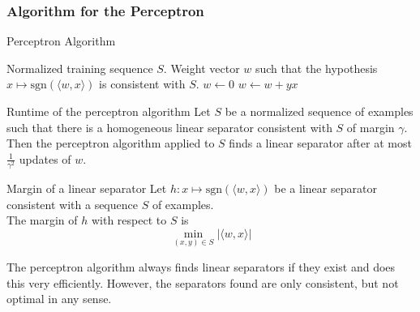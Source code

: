 \documentclass[english]{panikzettel}
\begin{document}
\subsubsection{Algorithm for the Perceptron}
\begin{halfboxl}
\vspace{-\baselineskip}
\begin{algo}{Perceptron Algorithm}
{
\renewcommand{\algorithmicrequire}{\textbf{Input:}}
\renewcommand{\algorithmicensure}{\textbf{Output:}}
  \begin{algorithmic}[1]
  \Require Normalized training sequence $S$.
  \Ensure Weight vector $w$ such that the hypothesis $x\mapsto \text{sgn}(\langle w,x\rangle)$ is consistent with $S$.
  \State $w \leftarrow 0$
  \Repeat
  	\State $w\leftarrow w+yx$
  \EndIf
  \EndFor
  \end{algorithmic}
  }
\end{algo}
\end{halfboxl}
\begin{halfboxr}
\vspace{-\baselineskip}
\begin{theo}{Runtime of the perceptron algorithm}
Let $S$ be a normalized sequence of examples such that there is a homogeneous linear separator consistent with $S$ of margin $\gamma$.\\
Then the perceptron algorithm applied to $S$ finds a linear separator after at most $\frac{1}{\gamma^2}$ updates of $w$.
\end{theo}

\begin{defi}{Margin of a linear separator}
Let $h:x\mapsto \text{sgn}(\langle w,x\rangle)$ be a linear separator consistent with a sequence $S$ of examples.\\
The margin of $h$ with respect to $S$ is
\[
\min_{(x,y)\in S} |\langle w,x\rangle|
\]
\end{defi}
\end{halfboxr}

The perceptron algorithm always finds linear separators if they exist and does this very efficiently. However, the separators found are only consistent, but not optimal in any sense.
\end{document}
